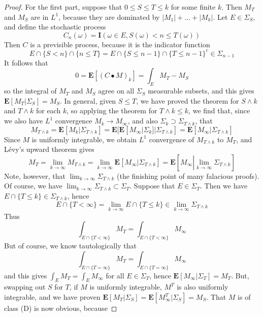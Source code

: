 \begin{proof}
    For the first part, suppose that $0 \leq S \leq T \leq k$ for some finite $k$. Then $M_T$ and $M_S$ are in $L^1$, because they are dominated by $|M_1| + \dots + |M_k|$. Let $E \in \Sigma_S$, and define the stochastic process
    \[ C_n(\omega) = \mathbf{I}(\omega \in E, S(\omega) < n \leq T(\omega)) \]
    Then $C$ is a previsible process, because it is the indicator function
    \[ E \cap \{ S < n \} \cap \{ n \leq T \} = E \cap \{ S \leq n-1 \} \cap \{ T \leq n-1 \}^c \in \Sigma_{n-1} \]
    It follows that
    \[ 0 = \mathbf{E}[(C \bullet M)_k] = \int_E M_T - M_S \]
    so the integral of $M_T$ and $M_S$ agree on all $\Sigma_S$ measurable subsets, and this gives $\mathbf{E}[M_T|\Sigma_S] = M_S$. In general, given $S \leq T$, we have proved the theorem for $S \wedge k$ and $T \wedge k$ for each $k$, so applying the theorem for $T \wedge k \leq k$, we find that, since we also have $L^1$ convergence $M_k \to M_\infty$, and also $\Sigma_k \supset \Sigma_{T \wedge k}$, that
    \[ M_{T \wedge k} = \mathbf{E}[M_k|\Sigma_{T \wedge k}] = \mathbf{E}[\mathbf{E}[M_\infty|\Sigma_k]|\Sigma_{T \wedge k}] = \mathbf{E}[M_\infty|\Sigma_{T \wedge k}] \]
    Since $M$ is uniformly integrable, we obtain $L^1$ convergence of $M_{T \wedge k}$ to $M_T$, and L\'{e}vy's upward theorem gives
    \[ M_T = \lim_{k \to \infty} M_{T \wedge k} = \lim_{k \to \infty} \mathbf{E}[M_\infty|\Sigma_{T \wedge k}] = \mathbf{E} \left[M_\infty \left| \lim_{k \to \infty} \Sigma_{T \wedge k} \right. \right] \]
    Note, however, that $\lim_{k \to \infty} \Sigma_{T \wedge k}$ (the finishing point of many falacious proofs). Of course, we have $\lim_{k \to \infty} \Sigma_{T \wedge k} \subset \Sigma_T$. Suppose that $E \in \Sigma_T$. Then we have $E \cap \{ T \leq k \} \in \Sigma_{T \wedge k}$, hence
    \[ E \cap \{ T < \infty \} = \lim_{k \to \infty} E \cap \{ T \leq k \} \in \lim_{k \to \infty} \Sigma_{T \wedge k} \]
    Thus
    \[ \int_{E \cap \{ T < \infty \}} M_T = \int_{E \cap \{ T < \infty \}} M_\infty \]
    But of course, we know tautologically that
    \[ \int_{E \cap \{ T = \infty \}} M_T = \int_{E \cap \{ T = \infty \}} M_\infty \]
    and this gives $\int_E M_T = \int_E M_\infty$ for all $E \in \Sigma_T$, hence $\mathbf{E}[M_\infty|\Sigma_T] = M_T$. But, swapping out $S$ for $T$, if $M$ is uniformly integrable, $M^T$ is also uniformly integrable, and we have proven $\mathbf{E}[M_T|\Sigma_S] = \mathbf{E}[M^T_\infty|\Sigma_S] = M_S$. That $M$ is of class (D) is now obvious, because

\end{proof}
